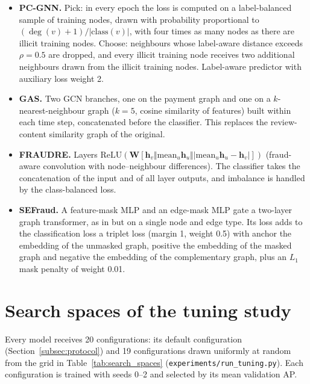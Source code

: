 \begin{itemize}
\item \textbf{PC-GNN.} Pick: in every epoch the loss is computed on a label-balanced sample of training nodes, drawn with probability proportional to $(\deg(v)+1)/|\mathrm{class}(v)|$, with four times as many nodes as there are illicit training nodes. Choose: neighbours whose label-aware distance exceeds $\rho=0.5$ are dropped, and every illicit training node receives two additional neighbours drawn from the illicit training nodes. Label-aware predictor with auxiliary loss weight 2.
\item \textbf{GAS.} Two GCN branches, one on the payment graph and one on a $k$-nearest-neighbour graph ($k=5$, cosine similarity of features) built within each time step, concatenated before the classifier. This replaces the review-content similarity graph of the original.
\item \textbf{FRAUDRE.} Layers $\mathrm{ReLU}(\mathbf{W}[\mathbf{h}_v\Vert\mathrm{mean}_u\mathbf{h}_u\Vert|\mathrm{mean}_u\mathbf{h}_u-\mathbf{h}_v|])$ (fraud-aware convolution with node--neighbour differences). The classifier takes the concatenation of the input and of all layer outputs, and imbalance is handled by the class-balanced loss.
\item \textbf{SEFraud.} A feature-mask MLP and an edge-mask MLP gate a two-layer graph transformer, as in \citet{li2024sefraud} but on a single node and edge type. Its loss adds to the classification loss a triplet loss (margin 1, weight 0.5) with anchor the embedding of the unmasked graph, positive the embedding of the masked graph and negative the embedding of the complementary graph, plus an $L_1$ mask penalty of weight 0.01.
\end{itemize}

\section{Search spaces of the tuning study}
\label{app:tuning}

Every model receives 20 configurations: its default configuration (Section~\ref{subsec:protocol}) and 19 configurations drawn uniformly at random from the grid in Table~\ref{tab:search_spaces} (\texttt{experiments/run\_tuning.py}). Each configuration is trained with seeds 0--2 and selected by its mean validation AP.

